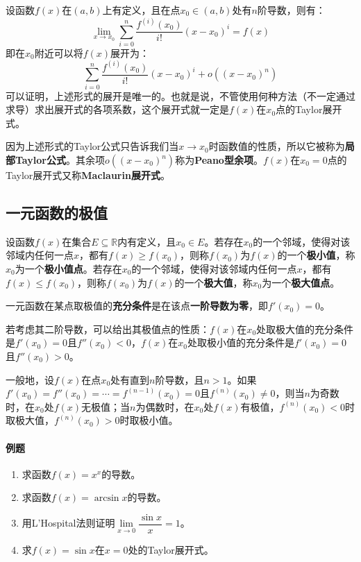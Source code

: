 \documentclass[fontset=none,openany,a4paper]{ctexbook}
\begin{document}
设函数$f(x)$在$(a,b)$上有定义，且在点$x_0\in(a,b)$处有$n$阶导数，则有：
\[
\lim_{x\to x_0}\sum_{i=0}^n\frac{f^{(i)}(x_0)}{i!}(x-x_0)^i = f(x)
\]
即在$x_0$附近可以将$f(x)$展开为：
\[
\sum_{i=0}^n\frac{f^{(i)}(x_0)}{i!}(x-x_0)^i + o((x-x_0)^n)
\]
可以证明，上述形式的展开是唯一的。也就是说，不管使用何种方法（不一定通过求导）求出展开式的各项系数，这个展开式就一定是$f(x)$在$x_0$点的Taylor展开式。

因为上述形式的Taylor公式只告诉我们当$x\to x_0$时函数值的性质，所以它被称为\textbf{局部Taylor公式}。其余项$o((x-x_0)^n)$称为\textbf{Peano型余项}。$f(x)$在$x_0=0$点的Taylor展开式又称\textbf{Maclaurin展开式}。

\subsection{一元函数的极值}

设函数$f(x)$在集合$E\subseteq\mathbb{R}$内有定义，且$x_0\in E$。若存在$x_0$的一个邻域，使得对该邻域内任何一点$x$，都有$f(x)\geqslant f(x_0)$，则称$f(x_0)$为$f(x)$的一个\textbf{极小值}，称$x_0$为一个\textbf{极小值点}。若存在$x_0$的一个邻域，使得对该邻域内任何一点$x$，都有$f(x)\leqslant f(x_0)$，则称$f(x_0)$为$f(x)$的一个\textbf{极大值}，称$x_0$为一个\textbf{极大值点}。

一元函数在某点取极值的\textbf{充分条件}是在该点\textbf{一阶导数为零}，即$f'(x_0)=0$。

若考虑其二阶导数，可以给出其极值点的性质：$f(x)$在$x_0$处取极大值的充分条件是$f'(x_0)=0$且$f''(x_0)<0$，$f(x)$在$x_0$处取极小值的充分条件是$f'(x_0)=0$且$f''(x_0)>0$。

一般地，设$f(x)$在点$x_0$处有直到$n$阶导数，且$n>1$。如果$f'(x_0)=f''(x_0)=\cdots=f^{(n-1)}(x_0)=0$且$f^{(n)}(x_0)\neq0$，则当$n$为奇数时，在$x_0$处$f(x)$无极值；当$n$为偶数时，在$x_0$处$f(x)$有极值，$f^{(n)}(x_0)<0$时取极大值，$f^{(n)}(x_0)>0$时取极小值。

\paragraph{例题}

\begin{enumerate}

    \item 求函数$f(x)=x^x$的导数。

    \item 求函数$f(x)=\arcsin x$的导数。

    \item 用L'Hospital法则证明$\lim\limits_{x\to0}\dfrac{\sin x}{x}=1$。

    \item 求$f(x)=\sin x$在$x=0$处的Taylor展开式。

\end{enumerate}
\end{document}
